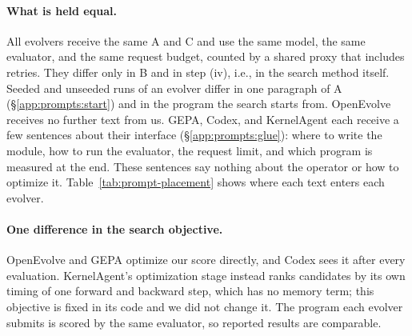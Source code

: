 \paragraph{What is held equal.} All evolvers receive the same A and C and use the same model, the same evaluator, and the same request budget, counted by a shared proxy that includes retries. They differ only in B and in step (iv), i.e., in the search method itself. Seeded and unseeded runs of an evolver differ in one paragraph of A (\S\ref{app:prompts:start}) and in the program the search starts from. OpenEvolve receives no further text from us. GEPA, Codex, and KernelAgent each receive a few sentences about their interface (\S\ref{app:prompts:glue}): where to write the module, how to run the evaluator, the request limit, and which program is measured at the end. These sentences say nothing about the operator or how to optimize it. Table~\ref{tab:prompt-placement} shows where each text enters each evolver.

\paragraph{One difference in the search objective.} OpenEvolve and GEPA optimize our score directly, and Codex sees it after every evaluation. KernelAgent's optimization stage instead ranks candidates by its own timing of one forward and backward step, which has no memory term; this objective is fixed in its code and we did not change it. The program each evolver submits is scored by the same evaluator, so reported results are comparable.

